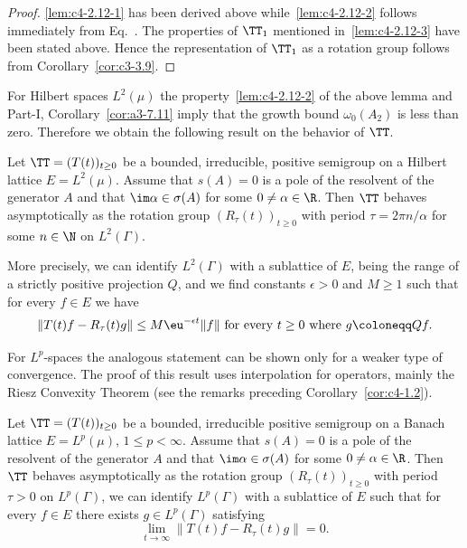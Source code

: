 \begin{proof}
\ref{lem:c4-2.12-1} has been derived above while~\ref{lem:c4-2.12-2} follows immediately from Eq.~.
The properties of\/ $\TT_{1}$ mentioned in~\ref{lem:c4-2.12-3} have been stated above.
Hence the representation of\/ $\TT_{1}$ as a rotation group follows from Corollary~\ref{cor:c3-3.9}.
\end{proof}
For Hilbert spaces $L^{2}(\mu)$ the property~\ref{lem:c4-2.12-2} of the above lemma and Part-I, Corollary~\ref{cor:a3-7.11} imply that the growth bound $\omega_{0}(A_{2})$ is less than zero.
Therefore we obtain the following result on the behavior of\/ $\TT$.
\begin{proposition}\label{prop:c4-2.13}
Let $\TT = (T(t))_{t\geq 0}$ be a bounded, irreducible, positive semigroup on a Hilbert lattice $E = L^{2}(\mu)$.
Assume that $s(A) = 0$ is a pole of the resolvent of the generator $A$ and that $\im\alpha \in \sigma(A)$ for some $0 \neq \alpha \in \R$.
Then $\TT$ behaves asymptotically as the rotation group $(R_{\tau}(t))_{t \geq 0}$ with period $\tau = 2\pi n/\alpha$ for some $n \in \N$ on $L^{2}(\Gamma)$.

More precisely, we can identify $L^{2}(\Gamma)$ with a sublattice of\/ $E$, being the range of a strictly positive projection $Q$, and we find constants $\epsilon > 0$ and $M \geq 1$ such that for every $f \in E$ we have
\begin{equation}\label{eq:c4-2.11}
\|T(t)f - R_{\tau}(t)g\| \leq M\eu^{-\epsilon t}\|f\| \text{ for every } t \geq 0 \text{ where } g \coloneqq Qf.
\end{equation}
\end{proposition}
For $L^{p}$-spaces the analogous statement can be shown only for a weaker type of convergence.
The proof of this result uses interpolation for operators, mainly the Riesz Convexity Theorem (see the remarks preceding Corollary~\ref{cor:c4-1.2}).
\begin{theorem}\label{thm:c4-2.14}
%
%
%
Let $\TT = (T(t))_{t \geq 0}$ be a bounded, irreducible positive semigroup on a Banach lattice $E = L^{p}(\mu)$, $1 \leq p < \infty$.
Assume that $s(A) = 0$ is a pole of the resolvent of the generator $A$ and that $\im\alpha \in \sigma(A)$ for some $0 \neq \alpha \in \R$.
Then $\TT$ behaves asymptotically as the rotation group $(R_{\tau}(t))_{t \geq 0}$ with period $\tau > 0$ on $L^{p}(\Gamma)$, \ie  we can identify $L^{p}(\Gamma)$ with a sublattice of\/ $E$ such that for every $f \in E$ there exists $g \in L^{p}(\Gamma)$ satisfying
\begin{equation}\label{eq:c4-2.12}
\lim_{t \to \infty} \|T(t)f - R_{\tau}(t)g\| = 0.
\end{equation}
\end{theorem}
